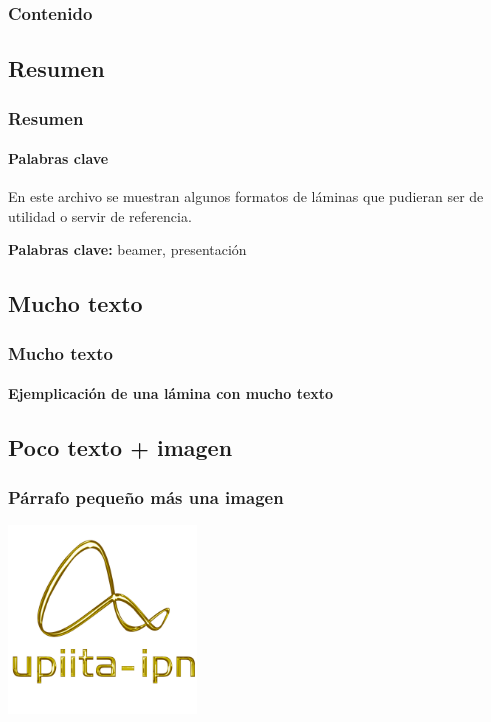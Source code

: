 	

	\begin{frame}
		\thispagestyle{empty} %
		\titlepage %
	\end{frame}
	\begin{frame}
		\frametitle{Contenido} %
		\tableofcontents 
	\end{frame}
	\begin{frame}
		\section{Resumen}
		\frametitle{Resumen} 
		\framesubtitle{Palabras clave}
		\label{Resumen}
		
		En este archivo se muestran algunos formatos de láminas que pudieran ser de utilidad o servir de referencia.
		
		\vspace{5mm}
		
		\label{Keywords}
		\textbf{{\large Palabras clave:}} beamer, presentación
	\end{frame}
	\begin{frame}
		\section{Mucho texto}
		\frametitle{Mucho texto}
		\framesubtitle{Ejemplicación de una lámina con mucho texto}
		\lipsum[1]
	\end{frame}
	\begin{frame}
		\section{Poco texto + imagen}
		\frametitle{Párrafo pequeño más una imagen}
		\lipsum[2][1-5]
		
		\begin{center}
			\includegraphics[height=50mm]{images/logo_upiita_oro}
		\end{center}
	\end{frame}
